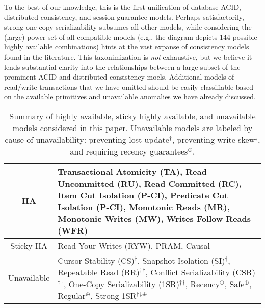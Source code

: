 To the best of our knowledge, this is the first unification of
database ACID, distributed consistency, and session guarantee
models. Perhaps satisfactorily, strong one-copy serializability
subsumes all other models, while considering the (large) power set of
all compatible models (e.g., the diagram depicts 144 possible highly available
combinations) hints at the vast expanse of consistency models found in
the literature. This taxonimization is \textit{not} exhaustive, but we
believe it lends substantial clarity into the relationships between a
large subset of the prominent ACID and distributed consistency
moels. Additional models of read/write transactions that we have
omitted should be easily classifiable based on the available
primitives and unavailable anomalies we have already discussed.

 \newcommand{\lostupdate}{$^\dagger$}
 \newcommand{\rwskew}{$^\ddagger$}
 \newcommand{\linearizable}{$^\oplus$}

\begin{table}[t!]
\begin{tabular}{| c | p{6cm} | }\hline
HA & Transactional Atomicity (TA), Read Uncommitted (RU), Read
Committed (RC), Item Cut Isolation (P-CI), Predicate Cut Isolation
(P-CI), Monotonic Reads (MR), Monotonic Writes (MW), Writes Follow
Reads (WFR)\\\hline Sticky-HA & Read Your Writes (RYW), PRAM,
Causal\\\hline Unavailable & Cursor Stability (CS)\lostupdate,
Snapshot Isolation (SI)\lostupdate, Repeatable Read
(RR)\lostupdate\rwskew, Conflict Serializability
(CSR)\lostupdate\rwskew, One-Copy Serializability
(1SR)\lostupdate\rwskew, Recency\linearizable, Safe\linearizable,
Regular\linearizable, Strong 1SR\lostupdate\rwskew\linearizable
\\\hline
\end{tabular}
\caption{Summary of highly available, sticky highly available, and
  unavailable models considered in this paper. Unavailable models are
  labeled by cause of unavailability: preventing lost
  update\lostupdate, preventing write skew\rwskew, and requiring
  recency guarantees\linearizable.}
\label{table:hatcompared}
\end{table}

